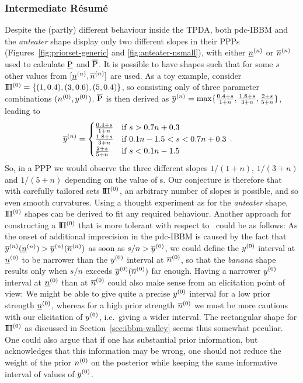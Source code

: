 \subsubsection{Intermediate R\'{e}sum\'{e}}
\label{sec:ibbm-resume}

Despite the (partly) different behaviour inside the TPDA, both %
pdc-IBBM and the \emph{anteater} shape display only two different slopes in their PPPs
(Figures~\ref{fig:priorset-generic} and \ref{fig:anteater-nsmall}),
with either $\underline{n}^{(n)}$ or $\overline{n}^{(n)}$ used to calculate $\underline{\operatorname{P}}$ and $\overline{\operatorname{P}}$.
It is possible to have shapes such that for some $s$ other
values from $[\underline{n}^{(n)}, \overline{n}^{(n)}]$ are used. As a toy example, consider
$\text{I}\!\Pi^{(0)} = \{ (1, 0.4), (3, 0.6), (5, 0.4) \}$, so consisting only of
three parameter combinations $(n^{(0)}, y^{(0)})$. $\overline{\operatorname{P}}$ is then derived
as $\overline{y}^{(n)} = \max \{ \frac{0.4 + s}{1 + n}, \frac{1.8 + s}{3 + n}, \frac{2 + s}{5 + n} \}$,
leading to
\begin{align*}
\overline{y}^{(n)} &= \begin{cases} \frac{0.4 + s}{1 + n} & \text{if }               s > 0.7 n + 0.3 \\
                      \frac{1.8 + s}{3 + n} & \text{if } 0.1 n - 1.5 < s < 0.7 n + 0.3 \\
                      \frac{2 + s}{5 + n}   & \text{if } s < 0.1 n - 1.5 \end{cases}\,.
\end{align*}
So, in a PPP %
we would observe the three different slopes $1/(1+n)$, $1/(3+n)$ and $1/(5+n)$
depending on the value of s. Our conjecture is therefore that with carefully tailored
sets $\text{I}\!\Pi^{(0)}$, an arbitrary number of slopes is possible, and so even smooth curvatures.
Using a thought experiment as for the \emph{anteater} shape, $\text{I}\!\Pi^{(0)}$ shapes can be derived to
fit any required behaviour. Another approach for constructing a $\text{I}\!\Pi^{(0)}$ that is more tolerant
with respect to \pdc\ could be as follows: As the onset of additional
imprecision in the pdc-IBBM is caused by the fact that $\overline{y}^{(n)}(\underline{n}^{(n)}) > \overline{y}^{(n)}(\overline{n}^{(n)})$
as soon as $s/n > \overline{y}^{(0)}$, we could define the $y^{(0)}$ interval at $\underline{n}^{(0)}$ %
to be narrower than the $y^{(0)}$ interval at $\overline{n}^{(0)}$, %
so that the \emph{banana} shape results only when $s/n$ exceeds $\overline{y}^{(0)}(\overline{n}^{(0)})$ far enough.
Having a narrower $y^{(0)}$ interval at $\underline{n}^{(0)}$ than at $\overline{n}^{(0)}$ could also make
sense from an elicitation point of view: We might be able
to give quite a precise $y^{(0)}$ interval for a low prior strength $\underline{n}^{(0)}$,
whereas for a high prior strength $\overline{n}^{(0)}$ we must be more cautious
with our elicitation of $y^{(0)}$, i.e.\ giving a wider interval.
The rectangular shape for $\text{I}\!\Pi^{(0)}$ as discussed in
Section~\ref{sec:ibbm-walley} seems thus somewhat peculiar. One
could also argue that if one has substantial prior information, but
acknowledges that this information may be wrong, one should not
reduce the weight of the prior $n^{(0)}$ on the posterior while keeping
the same informative interval of values of $y^{(0)}$.

